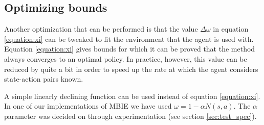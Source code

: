 \subsection{Optimizing bounds }
Another optimization that can be performed is that the value $\Delta \omega$ in equation \ref{equation:xi} can be tweaked to fit the environment that the agent is used with. Equation \ref{equation:xi} gives bounds for which it can be proved that the method always converges to an optimal policy. In practice, however, this value can be reduced by quite a bit in order to speed up the rate at which the agent considers state-action pairs known. 

A simple linearly declining function can be used instead of equation \ref{equation:xi}. In one of our implementations of MBIE we have used $\omega = 1 - \alpha N(s,a).$ The $\alpha$ parameter was decided on through experimentation (see section \ref{sec:test_spec}).